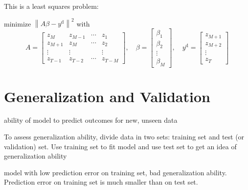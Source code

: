 \begin{problem}
    This is a least squares problem: 
    
    minimize $ \left\|A \beta-y^{\mathrm{d}}\right\|^{2} $ with
$$
A=\left[\begin{array}{cccc}
z_{M} & z_{M-1} & \cdots & z_{1} \\
z_{M+1} & z_{M} & \cdots & z_{2} \\
\vdots & \vdots & & \vdots \\
z_{T-1} & z_{T-2} & \cdots & z_{T-M}
\end{array}\right], \quad \beta=\left[\begin{array}{c}
\beta_{1} \\
\beta_{2} \\
\vdots \\
\beta_{M}
\end{array}\right], \quad y^{\mathrm{d}}=\left[\begin{array}{c}
z_{M+1} \\
z_{M+2} \\
\vdots \\
z_{T}
\end{array}\right]
$$

\end{problem}



\section{Generalization and Validation}

\begin{definition}
    ability of model to predict outcomes for new, unseen data
\end{definition}

\begin{definition}
    To assess generalization ability, divide data in two sets: training set and test (or validation) set. Use training set to fit model and use test set to get an idea of generalization ability
\end{definition}

\begin{definition}
    model with low prediction error on training set, bad generalization ability. Prediction error on training set is much smaller than on test set.
\end{definition}


